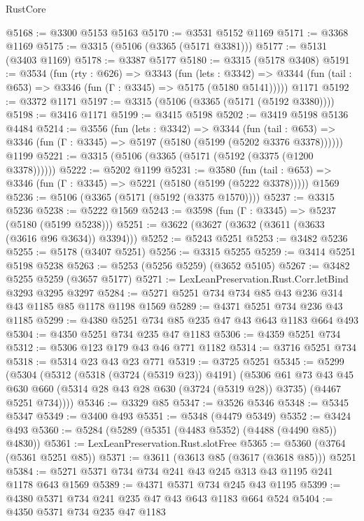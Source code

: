 \begin{lexlean}{RustCore}
\begin{coremodule}
@5168 := @3300 @5153 @5163
@5170 := @3531 @5152 @1169
@5171 := @3368 @1169
@5175 := @3315 (@5106 (@3365 (@5171 @3381)))
@5177 := @5131 (@3403 @1169)
@5178 := @3387 @5177
@5180 := @3315 (@5178 @3408)
@5191 := @3534
    (fun (rty : @626) =>
    @3343
      (fun (lets : @3342) =>
      @3344 (fun (tail : @653) => @3346 (fun (Γ : @3345) => @5175 (@5180 @5141)))))
    @1171
@5192 := @3372 @1171
@5197 := @3315 (@5106 (@3365 (@5171 (@5192 @3380))))
@5198 := @3416 @1171
@5199 := @3415 @5198
@5202 := @3419 @5198 @5136 @4484
@5214 := @3556
    (fun (lets : @3342) =>
    @3344
      (fun (tail : @653) => @3346 (fun (Γ : @3345) => @5197 (@5180 (@5199 (@5202 @3376 @3378))))))
    @1199
@5221 := @3315 (@5106 (@3365 (@5171 (@5192 (@3375 (@1200 @3378))))))
@5222 := @5202 @1199
@5231 := @3580
    (fun (tail : @653) => @3346 (fun (Γ : @3345) => @5221 (@5180 (@5199 (@5222 @3378)))))
    @1569
@5236 := @5106 (@3365 (@5171 (@5192 (@3375 @1570))))
@5237 := @3315 @5236
@5238 := @5222 @1569
@5243 := @3598 (fun (Γ : @3345) => @5237 (@5180 (@5199 @5238)))
@5251 := @3622 (@3627 (@3632 (@3611 (@3633 (@3616 @96 @3634)) @3394)))
@5252 := @5243 @5251
@5253 := @3482 @5236
@5255 := @5178 (@3407 @5251)
@5256 := @3315 @5255
@5259 := @3414 @5251 @5198 @5238
@5263 := @5253 (@5256 @5259) (@3652 @5105)
@5267 := @3482 @5255 @5259 (@3657 @5177)
@5271 := LexLeanPreservation.Rust.Corr.letBind @3293 @3295 @3297
@5284 := @5271 @5251 @734 @734 @85 @43 @236 @314 @43 @1185 @85 @1178 @1198 @1569
@5289 := @4371 @5251 @734 @236 @43 @1185
@5299 := @4380 @5251 @734 @85 @235 @47 @43 @643 @1183 @664 @493
@5304 := @4350 @5251 @734 @235 @47 @1183
@5306 := @4359 @5251 @734
@5312 := @5306 @123 @179 @43 @46 @771 @1182
@5314 := @3716 @5251 @734
@5318 := @5314 @23 @43 @23 @771
@5319 := @3725 @5251
@5345 := @5299
    (@5304
      (@5312
        (@5318 (@3724 (@5319 @23)) @4191)
        (@5306
          @61
          @73
          @43
          @45
          @630
          @660
          (@5314 @28 @43 @28 @630 (@3724 (@5319 @28)) @3735)
          (@4467 @5251 @734))))
@5346 := @3329 @85
@5347 := @3526 @5346
@5348 := @5345 @5347
@5349 := @3400 @493
@5351 := @5348 (@4479 @5349)
@5352 := @3424 @493
@5360 := @5284 (@5289 (@5351 (@4483 @5352) (@4488 (@4490 @85)) @4830))
@5361 := LexLeanPreservation.Rust.slotFree
@5365 := @5360 (@3764 (@5361 @5251 @85))
@5371 := @3611 (@3613 @85 (@3617 (@3618 @85))) @5251
@5384 := @5271 @5371 @734 @734 @241 @43 @245 @313 @43 @1195 @241 @1178 @643 @1569
@5389 := @4371 @5371 @734 @245 @43 @1195
@5399 := @4380 @5371 @734 @241 @235 @47 @43 @643 @1183 @664 @524
@5404 := @4350 @5371 @734 @235 @47 @1183

\end{coremodule}
\end{lexlean}
